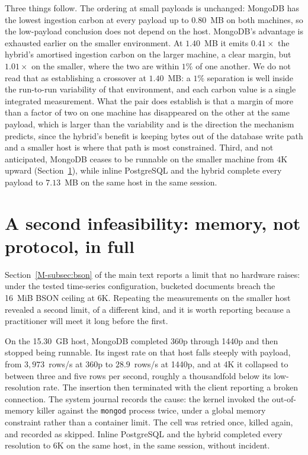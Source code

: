 \documentclass[11pt]{article}
\begin{document}
Three things follow. The ordering at small payloads is unchanged: MongoDB has the lowest ingestion carbon at every payload up to $0.80$~MB on both machines, so the low-payload conclusion does not depend on the host. MongoDB's advantage is exhausted earlier on the smaller environment. At $1.40$~MB it emits $0.41\times$ the hybrid's amortised ingestion carbon on the larger machine, a clear margin, but $1.01\times$ on the smaller, where the two are within $1\%$ of one another. We do not read that as establishing a crossover at $1.40$~MB: a $1\%$ separation is well inside the run-to-run variability of that environment, and each carbon value is a single integrated measurement. What the pair does establish is that a margin of more than a factor of two on one machine has disappeared on the other at the same payload, which is larger than the variability and is the direction the mechanism predicts, since the hybrid's benefit is keeping bytes out of the database write path and a smaller host is where that path is most constrained. Third, and not anticipated, MongoDB ceases to be runnable on the smaller machine from 4K upward (Section~\ref{sec:esm-memory}), while inline PostgreSQL and the hybrid complete every payload to $7.13$~MB on the same host in the same session.

\section{A second infeasibility: memory, not protocol, in full}\label{sec:esm-memory}
Section~\ref{M-subsec:bson} of the main text reports a limit that no hardware raises: under the tested time-series configuration, bucketed documents breach the 16~MiB BSON ceiling at 6K. Repeating the measurements on the smaller host revealed a second limit, of a different kind, and it is worth reporting because a practitioner will meet it long before the first.

On the 15.30~GB host, MongoDB completed 360p through 1440p and then stopped being runnable. Its ingest rate on that host falls steeply with payload, from $3{,}973$~rows/s at 360p to $28.9$~rows/s at 1440p, and at 4K it collapsed to between three and five rows per second, roughly a thousandfold below its low-resolution rate. The insertion then terminated with the client reporting a broken connection. The system journal records the cause: the kernel invoked the out-of-memory killer against the \texttt{mongod} process twice, under a global memory constraint rather than a container limit. The cell was retried once, killed again, and recorded as skipped. Inline PostgreSQL and the hybrid completed every resolution to 6K on the same host, in the same session, without incident.
\end{document}
